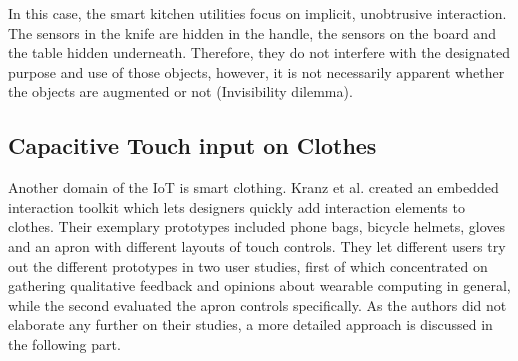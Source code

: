 In this case, the smart kitchen utilities focus on implicit, unobtrusive interaction.
The sensors in the knife are hidden in the handle, the sensors on the board and the table hidden underneath.
Therefore, they do not interfere with the designated purpose and use of those objects, however, it is not necessarily apparent whether the objects are augmented or not (Invisibility dilemma).

\subsection{Capacitive Touch input on Clothes}
\label{sec:touchInputOnClothes}
Another domain of the IoT is smart clothing. 
Kranz et al. created an embedded interaction toolkit which lets designers quickly add interaction elements to clothes.
Their exemplary prototypes included phone bags, bicycle helmets, gloves and an apron with different layouts of touch controls.
They let different users try out the different prototypes in two user studies, first of which concentrated on gathering qualitative feedback and opinions about wearable computing in general, while the second evaluated the apron controls specifically.
As the authors did not elaborate any further on their studies, a more detailed approach is discussed in the following part.

